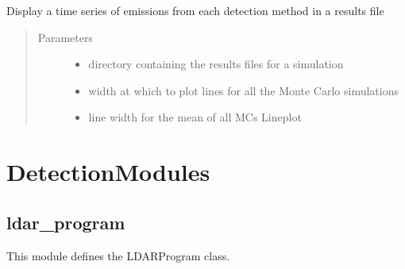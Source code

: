 \documentclass[letterpaper,10pt,english]{sphinxmanual}
\begin{document}
\begin{fulllineitems}
\label{\detokenize{index:feast.ResultsProcessing.plotting_functions.time_series_allmc_json}}
Display a time series of emissions from each detection method in a results file
\begin{quote}\begin{description}
\item[{Parameters}] \leavevmode\begin{itemize}
\item {} 
 \textendash{} directory containing the results files for a simulation

\item {} 
 \textendash{} width at which to plot lines for all the Monte Carlo simulations

\item {} 
 \textendash{} line width for the mean of all MCs Line\sphinxhyphen{}plot

\end{itemize}

\end{description}\end{quote}

\end{fulllineitems}



\section{DetectionModules}
\label{\detokenize{index:detectionmodules}}

\subsection{ldar\_program}
\label{\detokenize{index:module-feast.DetectionModules.ldar_program}}\label{\detokenize{index:ldar-program}}
This module defines the LDARProgram class.
\end{document}
